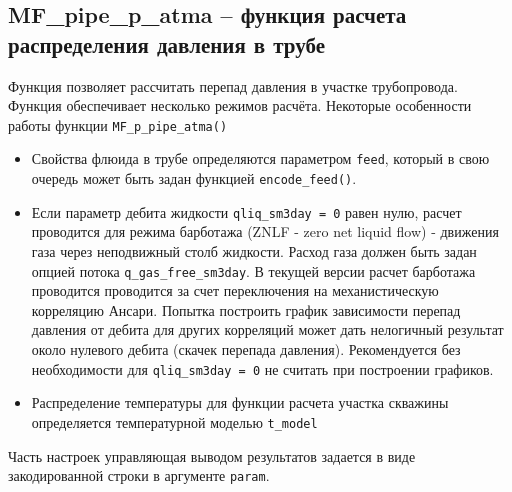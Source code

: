 \subsection{MF\_pipe\_p\_atma – функция расчета распределения давления в трубе}  


Функция позволяет рассчитать перепад давления в участке трубопровода. Функция обеспечивает несколько режимов расчёта. Некоторые особенности работы функции \texttt{MF_p_pipe_atma()}
\begin{itemize}
	\item Свойства флюида в трубе определяются параметром \texttt{feed}, который в свою очередь может быть задан функцией \texttt{encode_feed()}.
	\item Если параметр дебита жидкости  \texttt{qliq_sm3day = 0}  равен нулю, расчет проводится для режима барботажа (ZNLF - zero net liquid flow) - движения газа через неподвижный столб жидкости. Расход газа должен быть задан опцией потока \texttt{q_gas_free_sm3day}. В текущей версии \unf{} расчет барботажа проводится проводится за счет переключения на механистическую корреляцию Ансари. Попытка построить график зависимости перепад давления от дебита для других корреляций может дать нелогичный результат около нулевого дебита (скачек перепада давления). Рекомендуется без необходимости для \texttt{qliq_sm3day = 0} не считать при построении графиков.
	\item Распределение температуры для функции расчета участка скважины определяется температурной моделью \texttt{t_model} 
\end{itemize}


Часть настроек управляющая выводом результатов задается в виде закодированной строки в аргументе \texttt{param}.


